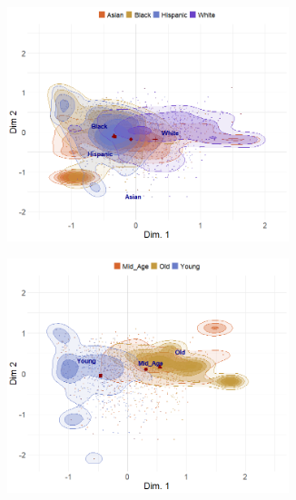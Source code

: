 \documentclass[12pt]{article}
\begin{document}
\begin{figure}[t]
    \captionsetup[subfigure]{font=footnotesize,labelfont=footnotesize}
    \centering
     \begin{subfigure}[b]{0.49\textwidth}
        \includegraphics[trim={0cm 0cm 0cm 0cm},clip, width=0.9\textwidth]{Plots/label-proto-ex1.png}
            \caption{}
            \label{fig:label-fuzz-a}
    \end{subfigure}
     \begin{subfigure}[b]{0.49\textwidth}
        \includegraphics[trim={0cm 0cm 0cm 0cm},clip, width=0.9\textwidth]{Plots/label-proto-ex2.png}
            \caption{}
            \label{fig:label-fuzz-b}
    \end{subfigure}

\end{figure}
\end{document}

